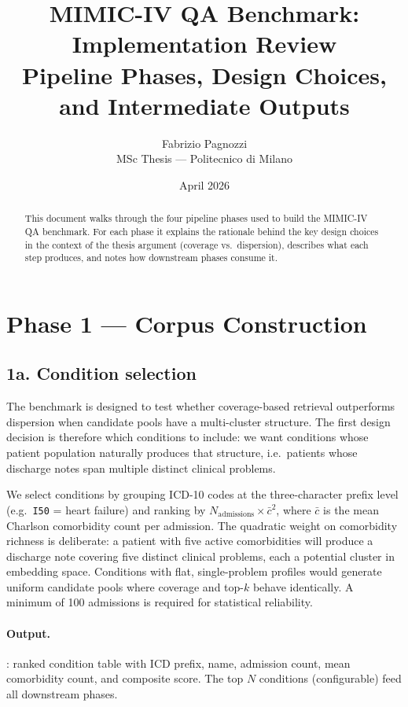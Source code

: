 \documentclass[11pt,a4paper]{article}
\title{\textbf{MIMIC-IV QA Benchmark: Implementation Review}\\[0.5em]\large Pipeline Phases, Design Choices, and Intermediate Outputs}
\author{Fabrizio Pagnozzi\\MSc Thesis --- Politecnico di Milano}
\date{April 2026}
\newcommand{\fname}[1]{\path{#1}}
\begin{document}
\setlength{\emergencystretch}{2em}
\maketitle

\begin{abstract}
	This document walks through the four pipeline phases used to build the MIMIC-IV QA benchmark. For each phase it explains the rationale behind the key design choices in the context of the thesis argument (coverage vs.\ dispersion), describes what each step produces, and notes how downstream phases consume it.
\end{abstract}

\tableofcontents
\newpage

\section{Phase 1 --- Corpus Construction}

\subsection{1a. Condition selection}

The benchmark is designed to test whether coverage-based retrieval outperforms dispersion when candidate pools have a multi-cluster structure. The first design decision is therefore which conditions to include: we want conditions whose patient population naturally produces that structure, i.e.\ patients whose discharge notes span multiple distinct clinical problems.

We select conditions by grouping ICD-10 codes at the three-character prefix level (e.g.\ \texttt{I50} = heart failure) and ranking by $N_{\text{admissions}} \times \bar{c}^{2}$, where $\bar{c}$ is the mean Charlson comorbidity count per admission. The quadratic weight on comorbidity richness is deliberate: a patient with five active comorbidities will produce a discharge note covering five distinct clinical problems, each a potential cluster in embedding space. Conditions with flat, single-problem profiles would generate uniform candidate pools where coverage and top-$k$ behave identically. A minimum of 100 admissions is required for statistical reliability.

\paragraph{Output.} \fname{conditions_stats.parquet}: ranked condition table with ICD prefix, name, admission count, mean comorbidity count, and composite score. The top $N$ conditions (configurable) feed all downstream phases.
\end{document}
